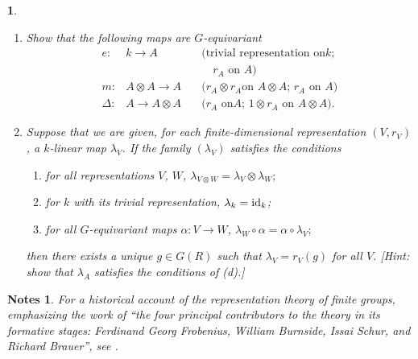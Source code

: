 \documentclass[a4paper,11pt,final]{memoir}%
\newtheorem*{nt}{Notes}
\newtheorem{exercise}[Y]{}
\theoremstyle{nonumberplain}
\begin{document}
\begin{exercise}
\begin{enumerate}
\item Show that the following maps are $G$-equivariant%
\begin{align*}
e\colon &  k\rightarrow A & \quad\text{(trivial representation on
}k\text{;}\\
& & \qquad r_{A}\text{ on }A)\\
m\colon &  A\otimes A\rightarrow A & \quad\text{(}r_{A}\otimes r_{A}\text{
on }A\otimes A\text{; }r_{A}\text{ on }A)\\
\Delta\colon &  A\rightarrow A\otimes A & \quad\text{(}r_{A}\text{ on
}A\text{; }1\otimes r_{A}\text{ on }A\otimes A).
\end{align*}


\item Suppose that we are given, for each finite-dimensional representation
$(V,r_{V})$, a $k$-linear map $\lambda_{V}$. If the family $(\lambda_{V})$
satisfies the conditions

\begin{enumerate}
\item for all representations $V$, $W$, $\lambda_{V\otimes W}=\lambda
_{V}\otimes\lambda_{W};$

\item for $k$ with its trivial representation, $\lambda_{k}=\operatorname{id}_{k}$;

\item for all $G$-equivariant maps $\alpha\colon V\rightarrow W$, $\lambda
_{W}\circ\alpha=\alpha\circ\lambda_{V};$
\end{enumerate}

\noindent then there exists a unique $g\in G(R)$ such that $\lambda_{V}%
=r_{V}(g)$ for all $V$. [Hint: show that $\lambda_{A}$ satisfies the
conditions of (d).]
\end{enumerate}
\end{exercise}

\begin{nt}
For a historical account of the representation theory of finite groups,
emphasizing the work of \textquotedblleft the four principal contributors to
the theory in its formative stages: Ferdinand Georg Frobenius, William
Burnside, Issai Schur, and Richard Brauer\textquotedblright, see
\cite{curtis1999}.
\end{nt}
\end{document}
